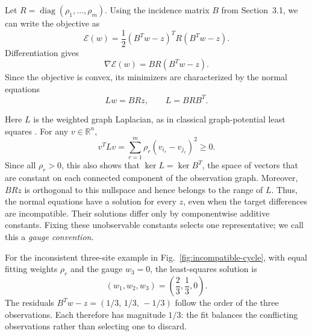 Let $R=\operatorname{diag}(\rho_1,\ldots,\rho_m)$. Using the incidence matrix $B$ from Section~3.1, we can write the objective as
\begin{equation}
\mathcal E(w)=\frac12(B^Tw-z)^TR(B^Tw-z).
\label{eq:matrix-least-squares}
\end{equation}
Differentiation gives
\begin{equation}
\nabla\mathcal E(w)=BR(B^Tw-z).
\end{equation}
Since the objective is convex, its minimizers are characterized by the normal equations
\begin{equation}
\boxed{Lw=BRz,\qquad L=BRB^T.}
\label{eq:laplacian-normal}
\end{equation}

Here $L$ is the weighted graph Laplacian, as in classical graph-potential least squares \citep{Jiang2011}. For any $v\in\mathbb R^n$,
\begin{equation}
v^TLv=\sum_{r=1}^{m}\rho_r(v_{i_r}-v_{j_r})^2\ge 0.
\end{equation}
Since all $\rho_r>0$, this also shows that $\ker L=\ker B^T$, the space of vectors that are constant on each connected component of the observation graph. Moreover, $BRz$ is orthogonal to this nullspace and hence belongs to the range of $L$. Thus, the normal equations have a solution for every $z$, even when the target differences are incompatible. Their solutions differ only by componentwise additive constants. Fixing these unobservable constants selects one representative; we call this a \emph{gauge convention}.

For the inconsistent three-site example in Fig.~\ref{fig:incompatible-cycle}, with equal fitting weights $\rho_r$ and the gauge $w_3=0$, the least-squares solution is
\begin{equation}
(w_1,w_2,w_3)=\left(\frac23,\frac13,0\right).
\end{equation}
The residuals $B^Tw-z=(1/3,\,1/3,\,-1/3)$ follow the order of the three observations. Each therefore has magnitude $1/3$: the fit balances the conflicting observations rather than selecting one to discard.

